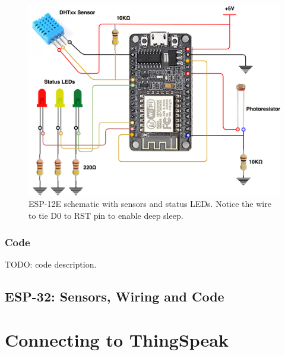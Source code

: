 \begin{figure}[H]
	\begin{center}
		\includegraphics[width=\textwidth]{./pictures/ESP-12E_wiring.png}
		\caption{ESP-12E schematic with sensors and status LEDs. Notice the wire to tie D0 to RST pin to enable deep sleep.}
		\label{esp12_wiring}
	\end{center}
\end{figure}

\subsubsection{Code}
TODO: code description.

\subsection{ESP-32: Sensors, Wiring and Code}

\section{Connecting to ThingSpeak}
